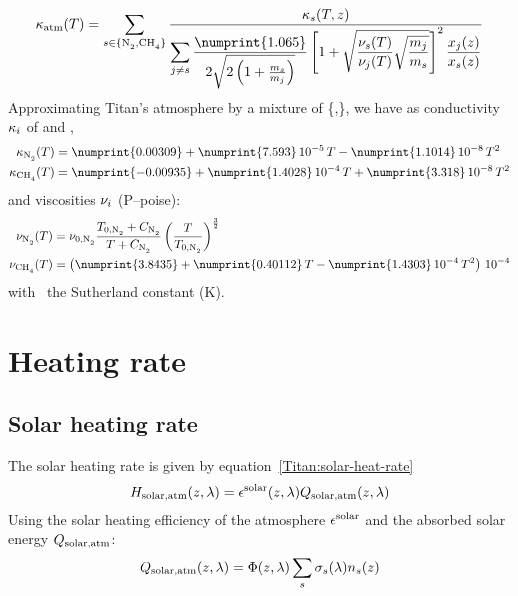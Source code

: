 \begin{equation}
\conductivity_\text{atm}(T) = \sum_{s \in \{\ce{N2}, \ce{CH4}\}} 
                              \frac{\conductivity_s(T,z)}
                                   {\displaystyle\sum_{j\neq s}\frac{\numprint{1.065}}{2\sqrt{2\left(1+\frac{\mass_s}{\mass_j}\right)}}
                                    \left[1 + \sqrt{\frac{\viscosity_s(T)}{\viscosity_j(T)}\sqrt{\frac{\mass_j}{\mass_s}}}\right]^2
                                    \frac{\molarfrac_j(z)}{\molarfrac_s(z)}
                                   }
\label{Titan:atmcond}
\end{equation}
Approximating Titan's
atmosphere by a mixture of \{,\}, we have as conductivity 
$\kappa_i$ of  and ,
\begin{equation}
\begin{split}
\conductivity_{\ce{N2}}(T)  & = \numprint{0.00309} + \numprint{7.593}\,10^{-5}\, T - \numprint{1.1014}\,10^{-8}\, T^2 \\
\conductivity_{\ce{CH4}}(T) & = \numprint{-0.00935} + \numprint{1.4028}\,10^{-4}\, T + \numprint{3.318}\,10^{-8}\, T^2
\end{split}
\label{Titan:conduc}
\end{equation}
and viscosities $\nu_i$ (\unit{P}--poise):
\begin{equation}
\begin{split}
\viscosity_{\ce{N2}}(T)  & = \viscosity_{0,\ce{N2}}\frac{T_{0,\ce{N2}} + \visC_{\ce{N2}}}{T + \visC_{\ce{N2}}}\left(\frac{T}{T_{0,\ce{N2}}}\right)^{\frac{3}{2}} \\
\viscosity_{\ce{CH4}}(T) & = \left(\numprint{3.8435} + \numprint{0.40112}\, T - \numprint{1.4303}\,10^{-4}\, T^2\right)\,10^{-4}
\end{split}
\label{Titan:visco}
\end{equation}
with \visC\ the Sutherland constant (\unit{K}).

\section{Heating rate}

\subsection{Solar heating rate}

The solar heating rate is given by equation~\ref{Titan:solar-heat-rate}
\begin{equation}
H_{\text{solar,atm}}(z,\lambda) = \epsilon^{\text{solar}}(z,\lambda)Q_{\text{solar,atm}}(z,\lambda)
\label{Titan:solar-heat-rate}
\end{equation}
Using the solar heating efficiency of the atmosphere $\epsilon^{\text{solar}}$ and
the absorbed solar energy $Q_{\text{solar,atm}}$:
\begin{equation}
Q_{\text{solar,atm}}(z,\lambda) = \Phi(z,\lambda)\sum_s \sigma_s(\lambda)n_s(z)
\label{Titan:solar-heat}
\end{equation}

